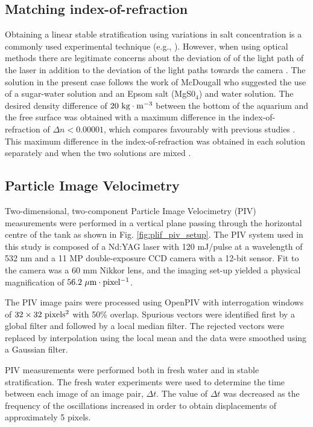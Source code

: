 \documentclass{piv13-abstract}
\newcommand{\unit}[1]{\ensuremath{\, \mathrm{\hspace{0.5mm}#1}}}
\newcommand{\figLabel}{Fig. }
\begin{document}
\subsection{Matching index-of-refraction}
\label{sec:ior}

Obtaining a linear stable stratification using variations in salt concentration is a commonly used experimental technique (e.g., \cite{Fernando1988,Spedding1997,Silva1998}). However, when using optical methods there are legitimate concerns about the deviation of of the light path of the laser \cite{McDougall1979} in addition to the deviation of the light paths towards the camera \cite{Alahyari1994}. The solution in the present case follows the work of McDougall \cite{McDougall1979} who suggested the use of a sugar-water solution and an Epsom salt (MgS0$_4$) and water solution. The desired density difference of $20\unit{kg\cdot m^{-3}}$ between the bottom of the aquarium and the free surface was obtained with a maximum difference in the index-of-refraction of $\Delta n < 0.00001$, which compares favourably with previous studies \cite{Daviero2001}. This maximum difference in the index-of-refraction was obtained in each solution separately and when the two solutions are mixed \cite{McDougall1979}. 

\subsection{Particle Image Velocimetry}
\label{sec:PIV}

Two-dimensional, two-component Particle Image Velocimetry (PIV) measurements were performed in a vertical plane passing through the horizontal centre of the tank as shown in \figLabel\ref{fig:plif_piv_setup}. The PIV system used in this study is composed of a Nd:YAG laser with 120 mJ/pulse at a wavelength of 532 nm and a 11 MP double-exposure CCD camera with a 12-bit sensor. Fit to the camera was a 60 mm Nikkor lens, and the imaging set-up yielded a physical magnification of $56.2\unit{\mu m\cdot pixel^{-1}}$.

The PIV image pairs were processed using OpenPIV \cite{Taylor2010} with interrogation windows of $32\times32\unit{pixels^2}$ with 50\% overlap. Spurious vectors were identified first by a global filter and followed by a local median filter. The rejected vectors were replaced by interpolation using the local mean and the data were smoothed using a Gaussian filter.

PIV measurements were performed both in fresh water and in stable stratification. The fresh water experiments were used to determine the time between each image of an image pair, $\Delta t$. The value of $\Delta t$ was decreased as the frequency of the oscillations increased in order to obtain displacements of approximately 5 pixels.
\end{document}
